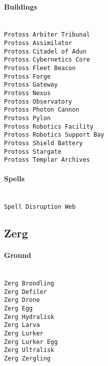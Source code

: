 \paragraph{Buildings} \mbox{}\\
\verb|Protoss Arbiter Tribunal| \\
\verb|Protoss Assimilator| \\
\verb|Protoss Citadel of Adun| \\
\verb|Protoss Cybernetics Core| \\
\verb|Protoss Fleet Beacon| \\
\verb|Protoss Forge| \\
\verb|Protoss Gateway| \\
\verb|Protoss Nexus| \\
\verb|Protoss Observatory| \\
\verb|Protoss Photon Cannon| \\
\verb|Protoss Pylon| \\
\verb|Protoss Robotics Facility| \\
\verb|Protoss Robotics Support Bay| \\
\verb|Protoss Shield Battery| \\
\verb|Protoss Stargate| \\
\verb|Protoss Templar Archives|

\paragraph{Spells} \mbox{}\\
\verb|Spell Disruption Web|

\subsection{Zerg}

\paragraph{Ground} \mbox{}\\
\verb|Zerg Broodling| \\
\verb|Zerg Defiler| \\
\verb|Zerg Drone| \\
\verb|Zerg Egg| \\
\verb|Zerg Hydralisk| \\
\verb|Zerg Larva| \\
\verb|Zerg Lurker| \\
\verb|Zerg Lurker Egg| \\
\verb|Zerg Ultralisk| \\
\verb|Zerg Zergling|

